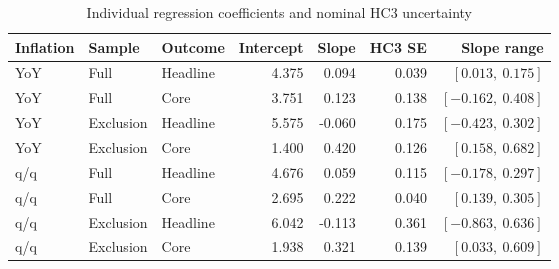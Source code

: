 \begin{table}[H]
\centering\small
\caption{Individual regression coefficients and nominal HC3 uncertainty}
\label{tab:regdetail}
\begin{tabular}{lllrrrr}
\toprule
Inflation & Sample & Outcome & Intercept & Slope & HC3 SE & Slope range\\
\midrule
YoY & Full & Headline & 4.375 & 0.094 & 0.039 & $[0.013,\ 0.175]$\\
YoY & Full & Core & 3.751 & 0.123 & 0.138 & $[-0.162,\ 0.408]$\\
YoY & Exclusion & Headline & 5.575 & -0.060 & 0.175 & $[-0.423,\ 0.302]$\\
YoY & Exclusion & Core & 1.400 & 0.420 & 0.126 & $[0.158,\ 0.682]$\\
q/q & Full & Headline & 4.676 & 0.059 & 0.115 & $[-0.178,\ 0.297]$\\
q/q & Full & Core & 2.695 & 0.222 & 0.040 & $[0.139,\ 0.305]$\\
q/q & Exclusion & Headline & 6.042 & -0.113 & 0.361 & $[-0.863,\ 0.636]$\\
q/q & Exclusion & Core & 1.938 & 0.321 & 0.139 & $[0.033,\ 0.609]$\\
\bottomrule
\end{tabular}
\end{table}
